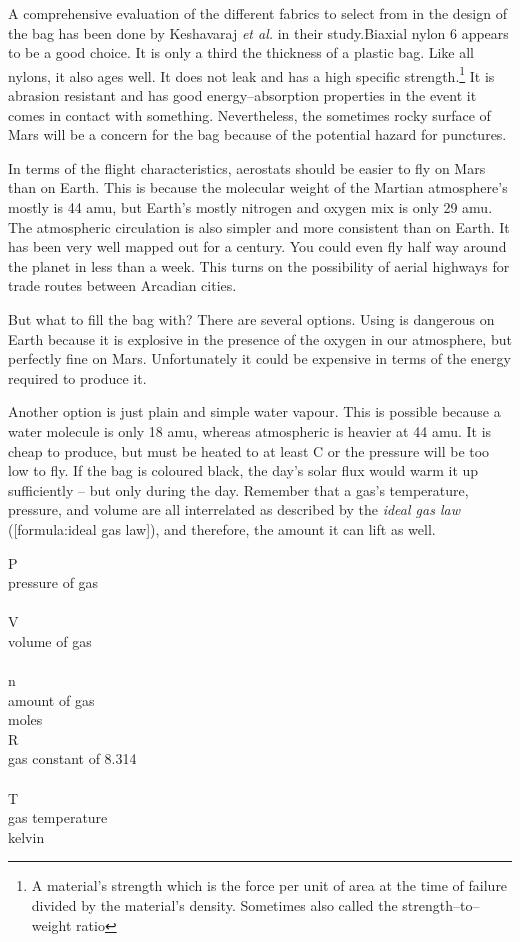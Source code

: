 A comprehensive evaluation of the different fabrics to select from in the design of the bag has been done by Keshavaraj {\it et al.} in their study.\footnotecite[keshavaraj1996] Biaxial nylon 6 appears to be a good choice. It is only a third the thickness of a plastic bag. Like all nylons, it also ages well. It does not leak and has a high specific strength.\footnote{A material's strength which is the force per unit of area at the time of failure divided by the material's density. Sometimes also called the strength--to--weight ratio} It is abrasion resistant and has good energy--absorption properties in the event it comes in contact with something. Nevertheless, the sometimes rocky surface of Mars will be a concern for the bag because of the potential hazard for punctures.

In terms of the flight characteristics, aerostats should be easier to fly on Mars than on Earth. This is because the molecular weight of the Martian atmosphere's mostly  is 44 amu, but Earth's mostly nitrogen and oxygen mix is only 29 amu. The atmospheric circulation is also simpler and more consistent than on Earth. It has been very well mapped out for a century. You could even fly half way around the planet in less than a week. This turns on the possibility of aerial highways for trade routes between Arcadian cities.

But what to fill the bag with? There are several options. Using  is dangerous on Earth because it is explosive in the presence of the oxygen in our atmosphere, but perfectly fine on Mars. Unfortunately it could be expensive in terms of the energy required to produce it. 

Another option is just plain and simple  water vapour. This is possible because a water molecule is only 18 amu, whereas atmospheric  is heavier at 44 amu. It is cheap to produce, but must be heated to at least C or the pressure will be too low to fly. If the bag is coloured black, the day's solar flux would warm it up sufficiently -- but only during the day. Remember that a gas's temperature, pressure, and volume are all interrelated as described by the {\it ideal gas law} ([formula:ideal gas law]), and therefore, the amount it can lift as well.

\crlf
{}
\startformula
{}
\stopformula
\startlegend
\leg P \\ pressure of gas \\ \\
\leg V \\ volume of gas \\ \\
\leg n \\ amount of gas \\ moles \\
\leg R \\ gas constant of 8.314 \\  \\
\leg T \\ gas temperature \\ kelvin \\
\stoplegend
\crlf

